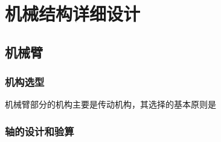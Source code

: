 
\chapter{机械结构详细设计}

\section{机械臂}




\subsection{机构选型}

机械臂部分的机构主要是传动机构，其选择的基本原则是

\subsection{轴的设计和验算}


